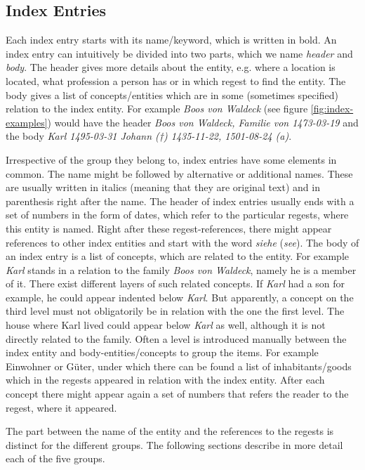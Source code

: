 \subsection{Index Entries}
Each index entry starts with its name/keyword, which is written in bold. An index entry can intuitively be divided into two parts, which we name \textit{header} and \textit{body}. The header gives more details about the entity, e.g. where a location is located, what profession a person has or in which regest to find the entity. The body gives a list of concepts/entities which are in some (sometimes specified) relation to the index entity. For example \textit{Boos von Waldeck} (see figure \ref{fig:index-examples}) would have the header \textit{Boos von Waldeck, Familie von 1473-03-19} and the body 
\textit{Karl 1495-03-31 Johann (†) 1435-11-22, 1501-08-24 (a)}.

Irrespective of the group they belong to, index entries have some elements in common.
The name might be followed by alternative or additional names. These are usually written in italics (meaning that they are original text) and in parenthesis right after the name. The header of index entries usually ends with a set of numbers in the form of dates, which refer to the particular regests, where this entity is named. Right after these regest-references, there might appear references to other index entities and start with the word \textit{siehe} (\textit{see}).
The body of an index entry is a list of concepts, which are related to the entity. For example \textit{Karl} stands in a relation to the family \textit{Boos von Waldeck}, namely he is a member of it. There exist different layers of such related concepts. If \textit{Karl} had a son for example, he could appear indented below \textit{Karl}. But apparently, a concept on the third level must not obligatorily be in relation with the one the first level. The house where Karl lived could appear below \textit{Karl} as well, although it is not directly related to the family. Often a level is introduced manually between the index entity and body-entities/concepts to group the items. For example Einwohner or Güter, under which there can be found a list of inhabitants/goods which in the regests appeared in relation with the index entity. After each concept there might appear again a set of numbers that refers the reader to the regest, where it appeared.

The part between the name of the entity and the references to the regests is distinct for the different groups. The following sections describe in more detail each of the five groups. 

